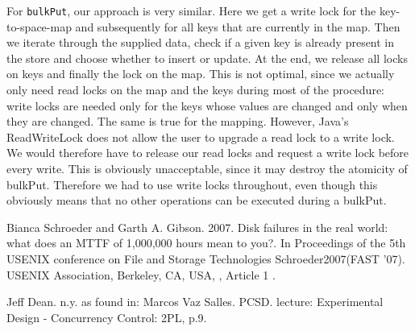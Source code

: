 \documentclass[12pt,a4paper]{article}
\begin{document}
For \texttt{bulkPut}, our approach is very similar. Here we get a write lock for the key-to-space-map and subsequently for all keys that are currently in the map. Then we iterate through the supplied data, check if a given key is already present in the store and choose whether to insert or update. At the end, we release all locks on keys and finally the lock on the map. This is not optimal, since we actually only need read locks on the map and the keys during most of the procedure: write locks are needed only for the keys whose values are changed and only when they are changed. The same is true for the mapping. However, Java's ReadWriteLock does not allow the user to upgrade a read lock to a write lock. We would therefore have to release our read locks and request a write lock before every write. This is obviously unacceptable, since it may destroy the atomicity of bulkPut. Therefore we had to use write locks throughout, even though this obviously means that no other operations can be executed during a bulkPut.
 
\begin{thebibliography}{1}

 Bianca Schroeder and Garth A. Gibson. 2007. Disk failures in the real world: what does an MTTF of 1,000,000 hours mean to you?. In Proceedings of the 5th USENIX conference on File and Storage Technologies Schroeder2007(FAST '07). USENIX Association, Berkeley, CA, USA, , Article 1 .

 Jeff Dean. n.y. as found in: Marcos Vaz Salles. PCSD. lecture: Experimental Design - Concurrency Control: 2PL, p.9.

\end{thebibliography}
\end{document}
